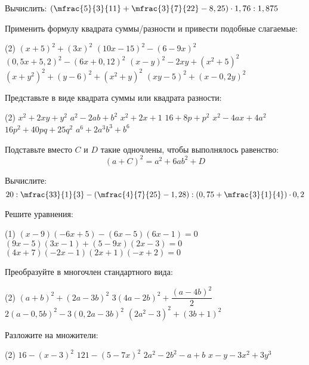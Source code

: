 \begin{homework}[number=3]
	\begin{listofex}
		\item Вычислить: \( \left( \mfrac{5}{3}{11} + \mfrac{3}{7}{22} - 8,25 \right) \cdot 1,76 : 1,875 \)
		\item Применить формулу квадрата суммы/разности и привести подобные слагаемые:
		\begin{tasks}(2)
			\task \( (x+5)^2+(3x)^2 \)
			\task \( (10x-15)^2-(6-9x)^2 \)
			\task \( (0,5x+5,2)^2-(6x+0,12)^2 \)
			\task \( (x-y)^2-2xy+(x^2+5)^2 \)
			\task \( (x+y^2)^2 + (y-6)^2 + (x^2+y)^2 \)
			\task  \( (xy-5)^2 + (x-0,2y)^2 \)
		\end{tasks}
		\item Представьте в виде квадрата суммы или квадрата разности:
		\begin{tasks}(2)
			\task \( x^2+2xy+y^2 \)
			\task \( a^2-2ab+b^2 \)
			\task \( x^2+2x+1 \)
			\task \( 16+8p+p^2 \)
			\task \( x^2-4ax+4a^2 \)
			\task \( 16p^2+40pq+25q^2 \)
			\task \( a^6+2a^3b^3+b^6 \)
		\end{tasks}
		\item Подставьте вместо \( C \) и \( D \) такие одночлены, чтобы выполнялось равенство:
		\[ (a + C)^2 = a^2 + 6ab^2 + D \]
	\end{listofex}
\end{homework}

\begin{exam}
	\begin{listofex}
		\item Вычислите:
		\[ 20 : \mfrac{33}{1}{3} - \left( \mfrac{4}{7}{25} - 1,28 \right) : \left( 0,75 + \mfrac{3}{1}{4} \right) \cdot 0,2 \]
		\item Решите уравнения:
		\begin{tasks}(1)
			\task \( (x-9)(-6x+5)-(6x-5)(6x-1)=0 \)
			\task \( (9x-5)(3x-1)+(5-9x)(2x-3)=0 \)
			\task \( (4x+7)(-2x-1)(2x+1)(-x+2)=0 \)
		\end{tasks}
		\item Преобразуйте в многочлен стандартного вида:
		\begin{tasks}(2)
			\task \( (a+b)^2+(2a-3b)^2 \)
			\task \( 3(4a-2b)^2+\dfrac{(a-4b)^2}{2} \)
			\task \( 2(a-0,5b)^2-3(0,2a-3b)^2 \)
			\task \( (2a^2-3)^2+(3b+1)^2 \)
		\end{tasks}
		\item Разложите на множители:
		\begin{tasks}(2)
			\task \(16-(x-3)^2\)
			\task \(121-(5-7x)^2\)
			\task \( 2a^2-2b^2-a+b \)
			\task \( x-y-3x^2+3y^3 \)
		\end{tasks}
	\end{listofex}
\end{exam}


